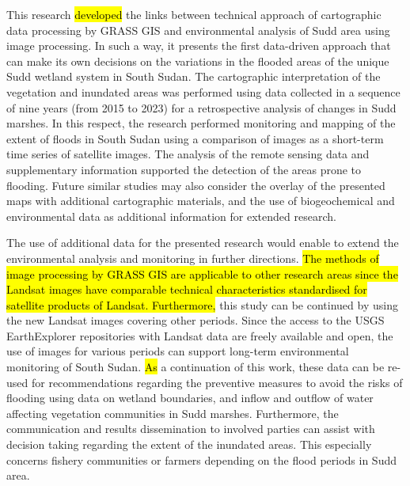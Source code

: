 \documentclass[analytics,article,submit,pdftex,moreauthors]{Definitions/mdpi}
\begin{document}
This research \hl{developed} the links between technical approach of cartographic data processing by GRASS GIS and environmental analysis of Sudd area using image processing. In such a way, it presents the first data-driven approach that can make its own decisions on the variations in the flooded areas of the unique Sudd wetland system in South Sudan. The cartographic interpretation of the vegetation and inundated areas was performed using data collected in a sequence of nine years (from 2015 to 2023) for a retrospective analysis of changes in Sudd marshes. In this respect, the research performed monitoring and mapping of the extent of floods in South Sudan using a comparison of images as a short-term time series of satellite images. The analysis of the remote sensing data and supplementary information supported the detection of the areas prone to flooding. Future similar studies may also consider the overlay of the presented maps with additional cartographic materials, and the use of biogeochemical and environmental data as additional information for extended research. 

The use of additional data for the presented research would enable to extend the environmental analysis and monitoring in further directions. \hl{The methods of image processing by GRASS GIS are applicable to other research areas since the Landsat images have comparable technical characteristics standardised for satellite products of Landsat. Furthermore, }this study can be continued by using the new Landsat images covering other periods. Since the access to the USGS EarthExplorer repositories with Landsat data are freely available and open, the use of images for various periods can support long-term environmental monitoring of South Sudan. \hl{As} a continuation of this work, these data can be re-used for recommendations regarding the preventive measures to avoid the risks of flooding using data on wetland boundaries, and inflow and outflow of water affecting vegetation communities in Sudd marshes. Furthermore, the communication and results dissemination to involved parties can assist with decision taking regarding the extent of the inundated areas. This especially concerns fishery communities or farmers depending on the flood periods in Sudd area. 


\end{document}
